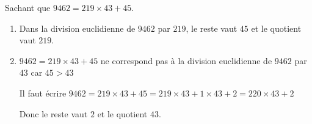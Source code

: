     Sachant que $\num{9462}=219\times 43 + 45$.

    \begin{enumerate}
        \item Dans la division euclidienne de $\num{9462}$ par $219$, le reste vaut $45$ et le quotient vaut $219$.
        \item $\num{9462}=219\times 43 + 45$ ne correspond pas à la division euclidienne de $\num{9462}$ par $43$ car $45>43$

        Il faut écrire $\num{9462}=219\times 43 + 45 = 219\times 43 + 1\times 43 + 2 = 220\times 43 +2$

        Donc le reste vaut $2$ et le quotient $43$.
    \end{enumerate}
